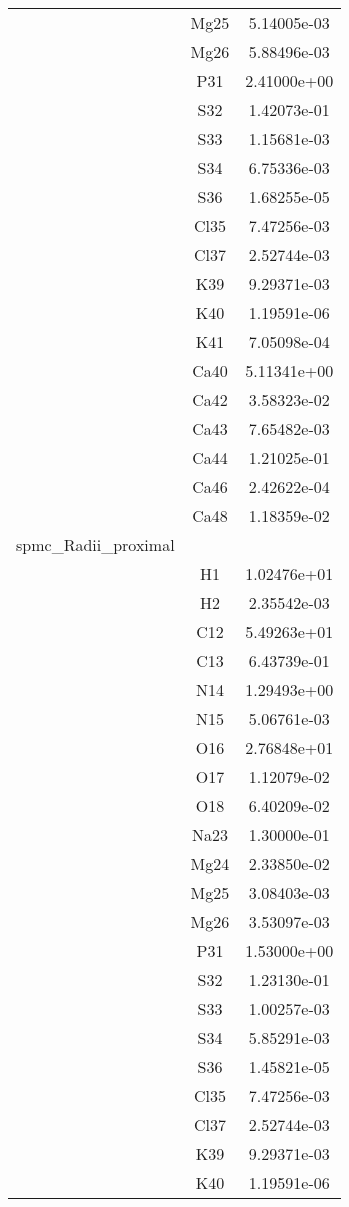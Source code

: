 \begin{centering}
\begin{longtable}{l c c}
& Mg25 & 5.14005e-03 \\ 
& Mg26 & 5.88496e-03 \\ 
& P31 & 2.41000e+00 \\ 
& S32 & 1.42073e-01 \\ 
& S33 & 1.15681e-03 \\ 
& S34 & 6.75336e-03 \\ 
& S36 & 1.68255e-05 \\ 
& Cl35 & 7.47256e-03 \\ 
& Cl37 & 2.52744e-03 \\ 
& K39 & 9.29371e-03 \\ 
& K40 & 1.19591e-06 \\ 
& K41 & 7.05098e-04 \\ 
& Ca40 & 5.11341e+00 \\ 
& Ca42 & 3.58323e-02 \\ 
& Ca43 & 7.65482e-03 \\ 
& Ca44 & 1.21025e-01 \\ 
& Ca46 & 2.42622e-04 \\ 
& Ca48 & 1.18359e-02 \\ 
\hline
spmc_Radii_proximal & & \\
\hline
& H1 & 1.02476e+01 \\ 
& H2 & 2.35542e-03 \\ 
& C12 & 5.49263e+01 \\ 
& C13 & 6.43739e-01 \\ 
& N14 & 1.29493e+00 \\ 
& N15 & 5.06761e-03 \\ 
& O16 & 2.76848e+01 \\ 
& O17 & 1.12079e-02 \\ 
& O18 & 6.40209e-02 \\ 
& Na23 & 1.30000e-01 \\ 
& Mg24 & 2.33850e-02 \\ 
& Mg25 & 3.08403e-03 \\ 
& Mg26 & 3.53097e-03 \\ 
& P31 & 1.53000e+00 \\ 
& S32 & 1.23130e-01 \\ 
& S33 & 1.00257e-03 \\ 
& S34 & 5.85291e-03 \\ 
& S36 & 1.45821e-05 \\ 
& Cl35 & 7.47256e-03 \\ 
& Cl37 & 2.52744e-03 \\ 
& K39 & 9.29371e-03 \\ 
& K40 & 1.19591e-06 \\ 

\end{longtable}
\end{centering}
